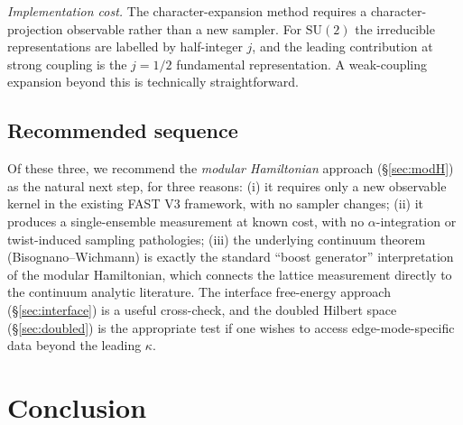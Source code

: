 \documentclass[11pt,a4paper]{article}
\theoremstyle{definition}
\newcommand{\SUtwo}{\mathrm{SU}(2)}
\begin{document}
\emph{Implementation cost.} The character-expansion method requires a
character-projection observable rather than a new sampler. For
$\SUtwo$ the irreducible representations are labelled by
half-integer $j$, and the leading contribution at strong coupling is
the $j = 1/2$ fundamental representation. A weak-coupling expansion
beyond this is technically straightforward.

\subsection{Recommended sequence}
\label{sec:roadmap-summary}

Of these three, we recommend the \emph{modular Hamiltonian} approach
(\S\ref{sec:modH}) as the natural next step, for three reasons:
(i) it requires only a new observable kernel in the existing FAST V3
framework, with no sampler changes;
(ii) it produces a single-ensemble measurement at known cost, with
no $\alpha$-integration or twist-induced sampling pathologies;
(iii) the underlying continuum theorem (Bisognano--Wichmann) is
exactly the standard ``boost generator'' interpretation of the
modular Hamiltonian, which connects the lattice measurement
directly to the continuum analytic literature. The interface
free-energy approach (\S\ref{sec:interface}) is a useful
cross-check, and the doubled Hilbert space (\S\ref{sec:doubled}) is
the appropriate test if one wishes to access edge-mode-specific
data beyond the leading $\kappa$.


\section{Conclusion}
\label{sec:conclusion}
\end{document}
